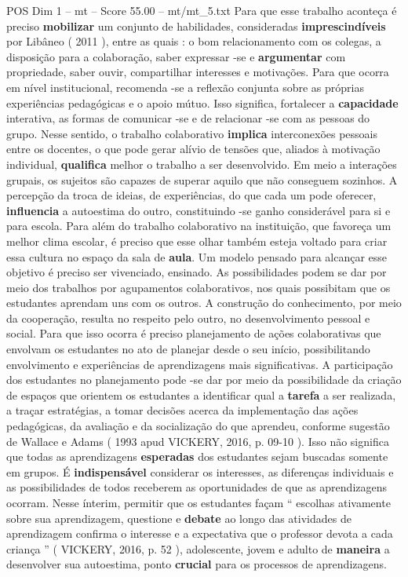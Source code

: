 \begin{textsample}{POS Dim 1 – mt – Score 55.00 – mt/mt\_5.txt}
Para que esse trabalho aconteça é preciso \textbf{mobilizar} um conjunto de habilidades, consideradas \textbf{imprescindíveis} por Libâneo ( 2011 ), entre as quais : o bom relacionamento com os colegas, a disposição para a colaboração, saber expressar -se e \textbf{argumentar} com propriedade, saber ouvir, compartilhar interesses e motivações.
Para que ocorra em nível institucional, recomenda -se a reflexão conjunta sobre as próprias experiências pedagógicas e o apoio mútuo.
Isso significa, fortalecer a \textbf{capacidade} interativa, as formas de comunicar -se e de relacionar -se com as pessoas do grupo.
Nesse sentido, o trabalho colaborativo \textbf{implica} interconexões pessoais entre os docentes, o que pode gerar alívio de tensões que, aliados à motivação individual, \textbf{qualifica} melhor o trabalho a ser desenvolvido.
Em meio a interações grupais, os sujeitos são capazes de superar aquilo que não conseguem sozinhos.
A percepção da troca de ideias, de experiências, do que cada um pode oferecer, \textbf{influencia} a autoestima do outro, constituindo -se ganho considerável para si e para escola.
Para além do trabalho colaborativo na instituição, que favoreça um melhor clima escolar, é preciso que esse olhar também esteja voltado para criar essa cultura no espaço da sala de \textbf{aula}.
Um modelo pensado para alcançar esse objetivo é preciso ser vivenciado, ensinado.
As possibilidades podem se dar por meio dos trabalhos por agupamentos colaborativos, nos quais possibitam que os estudantes aprendam uns com os outros.
A construção do conhecimento, por meio da cooperação, resulta no respeito pelo outro, no desenvolvimento pessoal e social.
Para que isso ocorra é preciso planejamento de ações colaborativas que envolvam os estudantes no ato de planejar desde o seu início, possibilitando envolvimento e experiências de aprendizagens mais significativas.
A participação dos estudantes no planejamento pode -se dar por meio da possibilidade da criação de espaços que orientem os estudantes a identificar qual a \textbf{tarefa} a ser realizada, a traçar estratégias, a tomar decisões acerca da implementação das ações pedagógicas, da avaliação e da socialização do que aprendeu, conforme sugestão de Wallace e Adams ( 1993 apud VICKERY, 2016, p. 09-10 ).
Isso não significa que todas as aprendizagens \textbf{esperadas} dos estudantes sejam buscadas somente em grupos.
É \textbf{indispensável} considerar os interesses, as diferenças individuais e as possibilidades de todos receberem as oportunidades de que as aprendizagens ocorram.
Nesse ínterim, permitir que os estudantes façam “ escolhas ativamente sobre sua aprendizagem, questione e \textbf{debate} ao longo das atividades de aprendizagem confirma o interesse e a expectativa que o professor devota a cada criança ” ( VICKERY, 2016, p. 52 ), adolescente, jovem e adulto de \textbf{maneira} a desenvolver sua autoestima, ponto \textbf{crucial} para os processos de aprendizagens.

\end{textsample}
